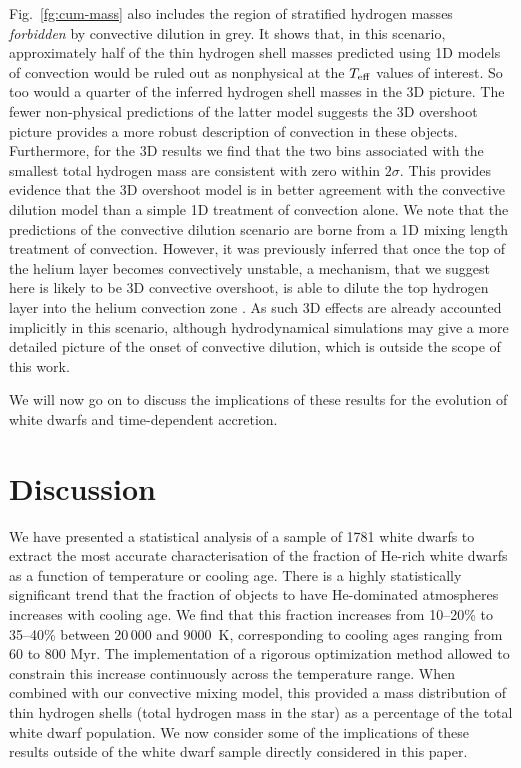 \documentclass[a4paper,fleqn,usenatbib]{mnras}
\begin{document}
Fig.~\ref{fg:cum-mass} also includes the region of stratified hydrogen masses \textit{forbidden} by convective dilution in grey. It shows that, in this scenario, approximately half of the thin hydrogen shell masses predicted using 1D models of convection would be ruled out as nonphysical at the $T_{\rm eff}$ values of interest. So too would a quarter of the inferred hydrogen shell masses in the 3D picture. The fewer non-physical predictions of the latter model suggests the 3D overshoot picture provides a more robust description of convection in these objects. Furthermore, for the 3D results we find that the two bins associated with the smallest total hydrogen mass are consistent with zero within $2\sigma$. This provides evidence that the 3D overshoot model is in better agreement with the convective dilution model than a simple 1D treatment of convection alone. We note that the predictions of the convective dilution scenario are borne from a 1D mixing length treatment of convection. However, it was previously inferred that once the top of the helium layer becomes convectively unstable, a mechanism, that we suggest here is likely to be 3D convective overshoot, is able to dilute the top hydrogen layer into the helium convection zone \citep{rolland18}. As such 3D effects are already accounted implicitly in this scenario, although hydrodynamical simulations may give a more detailed picture of the onset of convective dilution, which is outside the scope of this work. 

We will now go on to discuss the implications of these results for the evolution of white dwarfs and time-dependent accretion.

\section{Discussion}
\label{sec:discussion}

We have presented a statistical analysis of a sample of 1781 white dwarfs to extract the most accurate characterisation of the fraction of He-rich white dwarfs as a function of temperature or cooling age. There is a highly statistically significant trend that the fraction of objects to have He-dominated atmospheres increases with cooling age. We find that this fraction increases from 10--20\% to 35--40\% between 20\,000 and 9000~K, corresponding to cooling ages ranging from 60 to 800 Myr. The implementation of a rigorous optimization method allowed to constrain this increase continuously across the temperature range. When combined with our convective mixing model, this provided a mass distribution of thin hydrogen shells (total hydrogen mass in the star) as a percentage of the total white dwarf population. We now consider some of the implications of these results outside of the white dwarf sample directly considered in this paper. 
\end{document}
